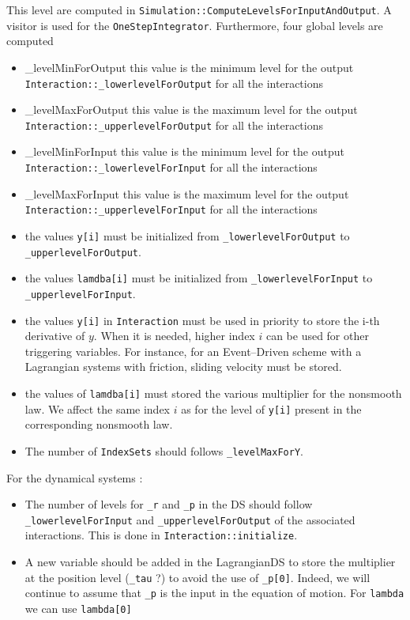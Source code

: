 This level are computed in {\tt Simulation::ComputeLevelsForInputAndOutput}. A visitor is used for the {\tt OneStepIntegrator}. Furthermore, four global levels are computed 
\begin{itemize}
\item {\_levelMinForOutput} this value is the minimum level for the output {\tt Interaction::\_lowerlevelForOutput}  for all the interactions
\item {\_levelMaxForOutput} this value is the maximum level for the output {\tt Interaction::\_upperlevelForOutput}  for all the interactions
\item {\_levelMinForInput} this value is the minimum level for the output {\tt Interaction::\_lowerlevelForInput}  for all the interactions
\item {\_levelMaxForInput} this value is the maximum level for the output {\tt Interaction::\_upperlevelForInput}  for all the interactions
\end{itemize}




\begin{itemize}
\item the values {\tt y[i]} must be initialized from {\tt \_lowerlevelForOutput} to {\tt \_upperlevelForOutput}.
\item the values {\tt lamdba[i]} must be initialized from {\tt \_lowerlevelForInput} to  {\tt \_upperlevelForInput}.
\item the values {\tt y[i]} in {\tt Interaction} must be used in priority to store the i-th derivative of $y$. When it is needed, higher index $i$ can be used for other triggering variables. For instance, for an Event--Driven scheme with a Lagrangian systems with friction, sliding velocity must be stored.
\item the values of {\tt lamdba[i]} must stored the various multiplier for the nonsmooth law. We affect the same index $i$ as for the level of {\tt y[i]} present in the corresponding nonsmooth law.
\item The number of {\tt IndexSets} should follows {\tt \_levelMaxForY}.
\end{itemize}



For the dynamical systems :
\begin{itemize}
\item The number of levels for {\tt \_r} and {\tt \_p} in the DS should follow {\tt \_lowerlevelForInput} and {\tt \_upperlevelForOutput} of the associated interactions. This is done in {\tt Interaction::initialize}.
\item A new variable should be added in the LagrangianDS to store the multiplier at the position level ({\tt \_tau} ?) to avoid the use of {\tt \_p[0]}. Indeed, we will continue to assume that {\tt \_p} is the input in the equation of motion. For {\tt lambda} we can  use {\tt lambda[0]} 
\end{itemize}

